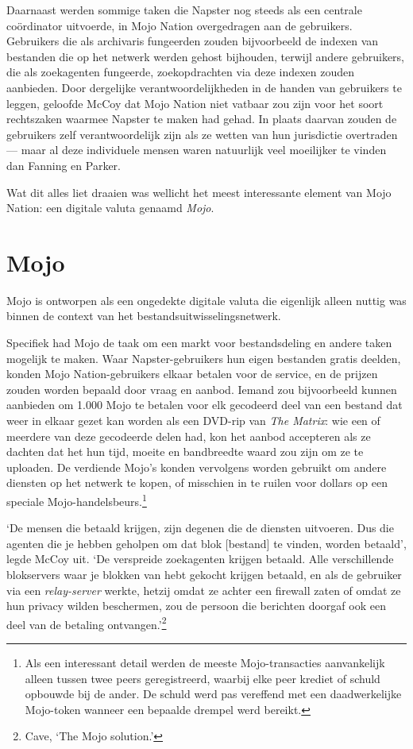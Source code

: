 \documentclass[
  a5paper,
  smalldemyvopaper,11pt,twoside,onecolumn,openright,extrafontsizes]{memoir}
\begin{document}
Daarnaast werden sommige taken die Napster nog steeds als een centrale
coördinator uitvoerde, in Mojo Nation overgedragen aan de gebruikers.
Gebruikers die als archivaris fungeerden zouden bijvoorbeeld de indexen
van bestanden die op het netwerk werden gehost bijhouden, terwijl andere
gebruikers, die als zoekagenten fungeerde, zoekopdrachten via deze
indexen zouden aanbieden. Door dergelijke verantwoordelijkheden in de
handen van gebruikers te leggen, geloofde McCoy dat Mojo Nation niet
vatbaar zou zijn voor het soort rechtszaken waarmee Napster te maken had
gehad. In plaats daarvan zouden de gebruikers zelf verantwoordelijk zijn
als ze wetten van hun jurisdictie overtraden --- maar al deze
individuele mensen waren natuurlijk veel moeilijker te vinden dan
Fanning en Parker.

Wat dit alles liet draaien was wellicht het meest interessante element
van Mojo Nation: een digitale valuta genaamd \emph{Mojo}.

\section{Mojo}\label{mojo}

Mojo is ontworpen als een ongedekte digitale valuta die eigenlijk alleen
nuttig was binnen de context van het bestandsuitwisselingsnetwerk.

Specifiek had Mojo de taak om een markt voor bestandsdeling en andere
taken mogelijk te maken. Waar Napster-gebruikers hun eigen bestanden
gratis deelden, konden Mojo Nation-gebruikers elkaar betalen voor de
service, en de prijzen zouden worden bepaald door vraag en aanbod.
Iemand zou bijvoorbeeld kunnen aanbieden om 1.000 Mojo te betalen voor
elk gecodeerd deel van een bestand dat weer in elkaar gezet kan worden
als een DVD-rip van \emph{The Matrix}: wie een of meerdere van deze
gecodeerde delen had, kon het aanbod accepteren als ze dachten dat het
hun tijd, moeite en bandbreedte waard zou zijn om ze te uploaden. De
verdiende Mojo's konden vervolgens worden gebruikt om andere diensten op
het netwerk te kopen, of misschien in te ruilen voor dollars op een
speciale Mojo-handelsbeurs.\footnote{Als een interessant detail werden
  de meeste Mojo-transacties aanvankelijk alleen tussen twee peers
  geregistreerd, waarbij elke peer krediet of schuld opbouwde bij de
  ander. De schuld werd pas vereffend met een daadwerkelijke Mojo-token
  wanneer een bepaalde drempel werd bereikt.}

`De mensen die betaald krijgen, zijn degenen die de diensten uitvoeren.
Dus die agenten die je hebben geholpen om dat blok {[}bestand{]} te
vinden, worden betaald', legde McCoy uit. `De verspreide zoekagenten
krijgen betaald. Alle verschillende blokservers waar je blokken van hebt
gekocht krijgen betaald, en als de gebruiker via een \emph{relay-server}
werkte, hetzij omdat ze achter een firewall zaten of omdat ze hun
privacy wilden beschermen, zou de persoon die berichten doorgaf ook een
deel van de betaling ontvangen.'\footnote{Cave, `The Mojo solution.'}
\end{document}
